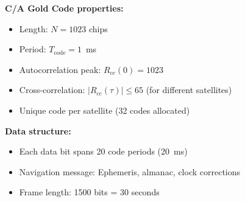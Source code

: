 \textbf{C/A Gold Code properties:}
\begin{itemize}
\item Length: $N = 1023$ chips
\item Period: $T_{\text{code}} = 1$~ms
\item Autocorrelation peak: $R_{cc}(0) = 1023$
\item Cross-correlation: $|R_{cc}(\tau)| \leq 65$ (for different satellites)
\item Unique code per satellite (32 codes allocated)
\end{itemize}

\textbf{Data structure:}
\begin{itemize}
\item Each data bit spans 20 code periods (20~ms)
\item Navigation message: Ephemeris, almanac, clock corrections
\item Frame length: 1500 bits = 30 seconds
\end{itemize}

